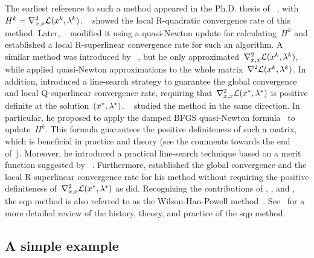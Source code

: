The earliest reference to such a method appeared in the Ph.D. thesis of \citeauthor{Wilson_1963}~\cite{Wilson_1963}, with~$H^k = \nabla_{x, x}^2 \lag(\iter[k], \lm[k])$.
~\cite{Robinson_1974} showed the local R-quadratic convergence rate of this method.
Later, \citeauthor{Garcia-Palomares_Mangasarian_1976}~\cite{Garcia-Palomares_1973,Garcia-Palomares_Mangasarian_1976} modified it using a quasi-Newton update for calculating~$H^k$ and established a local R-superlinear convergence rate for such an algorithm.
A similar method was introduced by \citeauthor{Han_1976}~\cite{Han_1976,Han_1977}, but he only approximated~$\nabla_{x, x}^2 \lag(\iter[k], \lm[k])$, while \citeauthor{Garcia-Palomares_Mangasarian_1976} applied quasi-Newton approximations to the whole matrix~$\nabla^2 \lag(\iter[k], \lm[k])$.
In addition, \citeauthor{Han_1976} introduced a line-search strategy to guarantee the global convergence and local Q-superlinear convergence rate, requiring that~$\nabla_{x, x}^2 \lag(\iter[\ast], \lm[\ast])$ is positive definite at the solution~$(\iter[\ast], \lm[\ast])$.
~\cite{Powell_1978b,Powell_1978a,Powell_1978c} studied the method in the same direction.
In particular, he proposed to apply the damped BFGS quasi-Newton formula~\cite[Eqs.~(5.8),~(5.9), and~(5.10)]{Powell_1978b} to update~$H^k$.
This formula guarantees the positive definiteness of such a matrix, which is beneficial in practice and theory (see the comments towards the end of~\cite[\S~2]{Powell_1978a}).
Moreover, he introduced a practical line-search technique based on a merit function suggested by \citeauthor{Han_1976}~\cite{Han_1976}.
Furthermore, \citeauthor{Powell_1978c} established the global convergence and the local R-superlinear convergence rate for his method without requiring the positive definiteness of~$\nabla_{x, x}^2 \lag(\iter[\ast], \lm[\ast])$ as \citeauthor{Han_1976} did.
Recognizing the contributions of \citeauthor{Wilson_1963}, , and \citeauthor{Powell_1978a}, the \gls{sqp} method is also referred to as the Wilson-Han-Powell method~\cite{Schittkowski_1981,Burke_1992}.
See~\cite{Boggs_Tolle_1995} for a more detailed review of the history, theory, and practice of the \gls{sqp} method.

\subsection{A simple example}
\label{subsec:sqp-simple-example}

